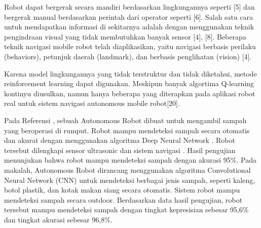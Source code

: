  Robot dapat bergerak secara mandiri berdasarkan lingkungannya seperti [5] dan bergerak manual berdasarkan perintah dari operator seperti [6]. Salah satu cara untuk mendapatkan informasi di sekitarnya adalah dengan menggunakan teknik pengindraan visual yang tidak membutuhkan banyak sensor [4], [8].
 Beberapa teknik navigasi mobile robot telah diaplikasikan, yaitu navigasi berbasis perilaku (behaviors), petunjuk daerah (landmark), dan berbasis penglihatan (vision) [4]. 
 
 
 
 Karena model lingkungannya yang tidak terstruktur dan tidak diketahui, metode reinforcement learning dapat digunakan.  Meskipun banyak algortima Q-learning kontinyu diusulkan, namun hanya beberapa yang diterapkan pada aplikasi robot real untuk sistem navigasi autonomous mobile robot[20]. 
 

 
 Pada Referensi \cite{Bai2018}, sebuah Autonomous Robot dibuat untuk mengambil sampah yang beroperasi di rumput. Robot mampu mendeteksi sampah secara otomatis dan akurat dengan menggunakan algoritma Deep Neural Network \cite{Kong2009}. Robot tersebut dilengkapi sensor ultrasonic\cite{Michael2008} dan sistem navigasi \cite{Wang2008}. Hasil pengujian menunjukan bahwa robot mampu mendeteksi sampah dengan akurasi 95\%. Pada makalah\cite{Arai2019}, Autonomous Robot dirancang menggunakan algoritma Convolutional Neural Network (CNN) untuk mendeteksi berbagai jenis sampah, seperti kaleng, botol plastik, dan kotak makan siang secara otomatis. Sistem robot mampu mendeteksi sampah secara outdoor. Berdasarkan data hasil pengujian\cite{Arai2019}, robot tersebut mampu mendeteksi sampah dengan tingkat kepresisian sebesar 95,6\% dan tingkat akurasi sebesar 96,8\%.
 
